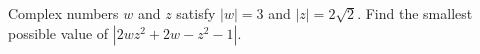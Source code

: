 Complex numbers $w$ and $z$ satisfy $|w|=3$ and $|z|=2\sqrt2$. Find the smallest possible value of $\left|2wz^2+2w-z^2-1\right|$.
